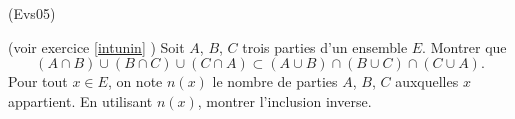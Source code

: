 \begin{tiny}(Evs05)\end{tiny} \label{intuni3} (voir exercice \ref{intunin} ) Soit $A$, $B$, $C$ trois parties d'un ensemble $E$. Montrer que
\[
  (A\cap B)\cup (B\cap C) \cup (C\cap A) \subset (A\cup B)\cap (B\cup C) \cap (C\cup A).
\]
Pour tout $x\in E$, on note $n(x)$ le nombre de parties $A$, $B$, $C$ auxquelles $x$ appartient. En utilisant $n(x)$, montrer l'inclusion inverse.
